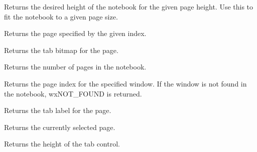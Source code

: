 
Returns the desired height of the notebook for the given page height. Use this to fit the notebook to
a given page size.

\label{wxauinotebookgetpage}


Returns the page specified by the given index.

\label{wxauinotebookgetpagebitmap}


Returns the tab bitmap for the page.

\label{wxauinotebookgetpagecount}


Returns the number of pages in the notebook.

\label{wxauinotebookgetpageindex}


Returns the page index for the specified window.  If the window is not found in
the notebook, wxNOT\_FOUND is returned.

\label{wxauinotebookgetpagetext}


Returns the tab label for the page.

\label{wxauinotebookgetselection}


Returns the currently selected page.

\label{wxauinotebookgettabctrlheight}


Returns the height of the tab control.

\label{wxauinotebookinsertpage}


